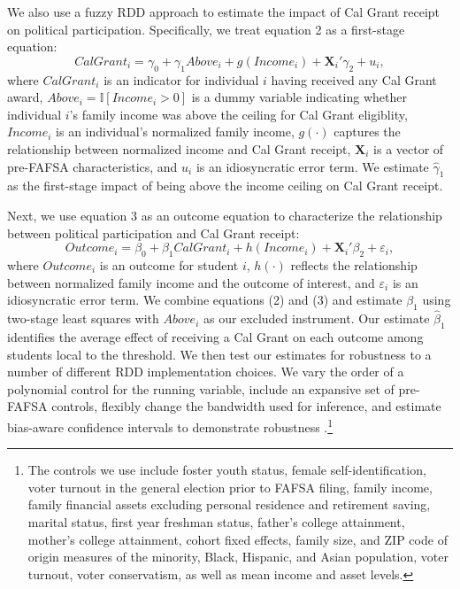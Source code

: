 \documentclass[12pt,letterpaper,oneside]{book}
\begin{document}
We also use a fuzzy RDD approach to estimate the impact of Cal Grant receipt on political participation. Specifically, we treat equation 2 as a first-stage equation:\begin{equation} CalGrant_{i}=\gamma_{0} +\gamma_{1} Above_{i}+ g(Income_{i})+\textbf{X}_{i}'\gamma_{2}+u_{i},
\end{equation}
where $CalGrant_{i}$ is an indicator for individual $i$ having received any Cal Grant award, $Above_{i}=\mathbb{I}[Income_{i}> 0]$ is a dummy variable indicating whether individual $i$'s family income was above the ceiling for Cal Grant eligiblity, $Income_{i}$ is an individual's normalized family income,  $g(\cdot)$ captures the relationship between normalized income and Cal Grant receipt, $\textbf{X}_{i}$ is a vector of pre-FAFSA characteristics, and $u_{i}$ is an idiosyncratic error term. We estimate $\hat\gamma_1$ as the first-stage impact of being above the income ceiling on Cal Grant receipt.

Next, we use equation 3 as an outcome equation to characterize the relationship between political participation and Cal Grant receipt:
\begin{equation} Outcome_{i}=\beta_{0} +\beta_{1} CalGrant_{i}+ h(Income_{i})+\textbf{X}_{i}'\beta_{2}+\varepsilon_{i},
\end{equation}
where $Outcome_{i}$ is an outcome for student $i$,  $h(\cdot)$ reflects the relationship between normalized family income and the outcome of interest, and $\varepsilon_i$ is an idiosyncratic error term. We combine equations (2) and (3) and estimate $\beta_1$ using two-stage least squares with $Above_{i}$ as our excluded instrument. Our estimate $\hat\beta_1$ identifies the average effect of receiving a Cal Grant on each outcome among students local to the threshold. We then test our estimates for robustness to a number of different RDD implementation choices. We vary the order of a polynomial control for the running variable, include an expansive set of pre-FAFSA controls, flexibly change the bandwidth used for inference, and estimate bias-aware confidence intervals to demonstrate robustness \citep{calonico_robust_2014}.\footnote{The controls we use include foster youth status, female self-identification, voter turnout in the general election prior to FAFSA filing, family income, family financial assets excluding personal residence and retirement saving, marital status, first year freshman status, father's college attainment, mother's college attainment, cohort fixed effects, family size, and ZIP code of origin measures of the minority, Black, Hispanic, and Asian population, voter turnout, voter conservatism, as well as mean income and asset levels.}
\end{document}
